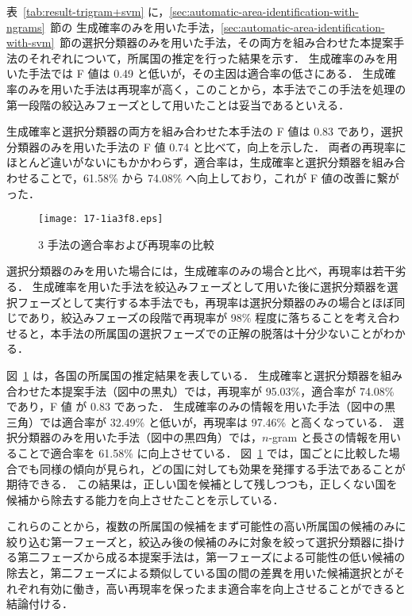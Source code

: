 \documentclass[japanese]{jnlp_1.4}
\begin{document}
表~\ref{tab:result-trigram+svm} に，\ref{sec:automatic-area-identification-with-ngrams}~節の 生成確率のみを用いた手法，\ref{sec:automatic-area-identification-with-svm}~節の選択分類器のみを用いた手法，その両方を組み合わせた本提案手法のそれぞれについて，所属国の推定を行った結果を示す．
生成確率のみを用いた手法では F 値は 0.49 と低いが，その主因は適合率の低さにある．
生成確率のみを用いた手法は再現率が高く，このことから，本手法でこの手法を処理の第一段階の絞込みフェーズとして用いたことは妥当であるといえる．

生成確率と選択分類器の両方を組み合わせた本手法の F 値は 0.83 であり，選択分類器のみを用いた手法の F 値 0.74 と比べて，向上を示した．
両者の再現率にほとんど違いがないにもかかわらず，適合率は，生成確率と選択分類器を組み合わせることで，61.58\% から 74.08\% へ向上しており，これが F 値の改善に繋がった．

\begin{figure}[b]
\vspace{-0.5\baselineskip}
 \begin{center}
  \texttt{[image: 17-1ia3f8.eps]}
 \end{center}
  \caption{3 手法の適合率および再現率の比較}
  \label{fig:result-trigram+svm}
\end{figure}

選択分類器のみを用いた場合には，生成確率のみの場合と比べ，再現率は若干劣る．
生成確率を用いた手法を絞込みフェーズとして用いた後に選択分類器を選択フェーズとして実行する本手法でも，再現率は選択分類器のみの場合とほぼ同じであり，絞込みフェーズの段階で再現率が 98\% 程度に落ちることを考え合わせると，本手法の所属国の選択フェーズでの正解の脱落は十分少ないことがわかる．

図~\ref{fig:result-trigram+svm} は，各国の所属国の推定結果を表している．
生成確率と選択分類器を組み合わせた本提案手法（図中の黒丸）では，再現率が 95.03\%，適合率が 74.08\% であり，F 値 が 0.83 であった．
生成確率のみの情報を用いた手法（図中の黒三角）では適合率が 32.49\% と低いが，再現率は 97.46\% と高くなっている．
選択分類器のみを用いた手法（図中の黒四角）では，$n$-gram と長さの情報を用いることで適合率を 61.58\% に向上させている．
図~\ref{fig:result-trigram+svm} では，国ごとに比較した場合でも同様の傾向が見られ，どの国に対しても効果を発揮する手法であることが期待できる．
この結果は，正しい国を候補として残しつつも，正しくない国を候補から除去する能力を向上させたことを示している．

これらのことから，複数の所属国の候補をまず可能性の高い所属国の候補のみに絞り込む第一フェーズと，絞込み後の候補のみに対象を絞って選択分類器に掛ける第二フェーズから成る本提案手法は，第一フェーズによる可能性の低い候補の除去と，第二フェーズによる類似している国の間の差異を用いた候補選択とがそれぞれ有効に働き，高い再現率を保ったまま適合率を向上させることができると結論付ける．
\end{document}
